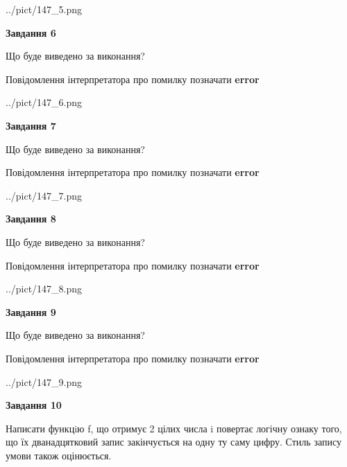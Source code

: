 \documentclass[12pt, ukrainian]{article}
\begin{document}
{\begin {large}
\begin{center}
	{../pict/147_5.png}
\end{center}
\newpage

{\begin {center}\textbf{Завдання 6}\end {center}}\par
Що буде виведено за виконання? \par
Повідомлення інтерпретатора про помилку позначати \textbf{error}

\begin{center}
	{../pict/147_6.png}
\end{center}
\newpage

{\begin {center}\textbf{Завдання 7}\end {center}}\par
Що буде виведено за виконання? \par
Повідомлення інтерпретатора про помилку позначати \textbf{error}

\begin{center}
	{../pict/147_7.png}
\end{center}
\newpage

{\begin {center}\textbf{Завдання 8}\end {center}}\par
Що буде виведено за виконання? \par
Повідомлення інтерпретатора про помилку позначати \textbf{error}

\begin{center}
	{../pict/147_8.png}
\end{center}
\newpage

{\begin {center}\textbf{Завдання 9}\end {center}}\par
Що буде виведено за виконання? \par
Повідомлення інтерпретатора про помилку позначати \textbf{error}

\begin{center}
	{../pict/147_9.png}
\end{center}
\newpage

{\begin {center}\textbf{Завдання 10}\end {center}}\par

Написати функцiю f, що отримує 2 цілих числа i повертає логічну ознаку того, що їх дванадцятковий запис закінчується на одну ту саму цифру. Стиль запису умови також оцінюється.\par
\newpage

\end {large}}
\end{document}
